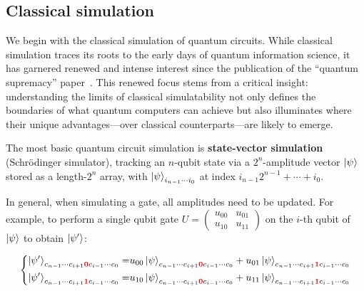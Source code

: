 \documentclass[a4paper,onecolumn,11pt,unpublished]{quantumarticle}
\begin{document}
\subsection{Classical simulation}

We begin with the classical simulation of quantum circuits. While classical simulation traces its roots to the early days of quantum information science, it has garnered renewed and intense interest since the publication of the ``quantum supremacy'' paper~\cite{Arute2019Quantum}. This renewed focus stems from a critical insight: understanding the limits of classical simulatability not only defines the boundaries of what quantum computers can achieve but also illuminates where their unique advantages---over classical counterparts---are likely to emerge.

The most basic quantum circuit simulation is \textbf{state-vector simulation} (Schrödinger simulator), tracking an $n$-qubit state via a $2^n$-amplitude vector $\ket{\psi}$ stored as a length-$2^n$ array, with $\ket{\psi}_{i_{n-1}\cdots i_0}$ at index $i_{n-1}2^{n-1}+\cdots+i_0$.

In general, when simulating a gate, all amplitudes need to be updated. For example, to perform a single qubit gate $U = \left(\begin{array}{cc}
    u_{00} & u_{01} \\
    u_{10} & u_{11}
\end{array}\right)$ on the $i$-th qubit of $\ket{\psi}$ to obtain $\ket{\psi'}$:

\begin{equation}
            \left\{\begin{aligned}
                \ket{\psi'}_{c_{n-1}\cdots c_{i+1}\textbf{\color{red}0}c_{i-1}\cdots c_0}=&u_{00}\ket{\psi}_{c_{n-1}\cdots c_{i+1}\textbf{\color{red}0}c_{i-1}\cdots c_0}
                +u_{01}\ket{\psi}_{c_{n-1}\cdots c_{i+1}\textbf{\color{red}1}c_{i-1}\cdots c_0}\\
                \ket{\psi'}_{c_{n-1}\cdots c_{i+1}\textbf{\color{red}1}c_{i-1}\cdots c_0}=&u_{10}\ket{\psi}_{c_{n-1}\cdots c_{i+1}\textbf{\color{red}0}c_{i-1}\cdots c_0}
                +u_{11}\ket{\psi}_{c_{n-1}\cdots c_{i+1}\textbf{\color{red}1}c_{i-1}\cdots c_0}
            \end{aligned}\right.
        \end{equation}
\end{document}
